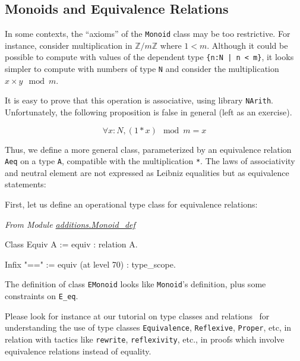 \subsection{Monoids and Equivalence Relations}

In some contexts, the ``axioms'' of the \texttt{Monoid} class  may be too restrictive.
For instance, consider multiplication in $\mathds{Z}/m\mathds{Z}$ where
 $1<m$.
Although it could be possible to compute with values of the dependent 
type \texttt{\{n:N | n < m\}}, 
it looks simpler to compute with numbers of type
\texttt{N} and consider the multiplication $x \times y \mod{m}$.



It is easy to prove that this operation is associative, using library \texttt{NArith}. Unfortunately, the following proposition is false in general (left as an exercise).

$$\forall x:N, (1 * x) \mod{m} = x$$


Thus, we define a more general class, parameterized by an equivalence
relation \texttt{Aeq}  on a type \texttt{A}, compatible with the multiplication \texttt{*}. The laws of associativity and neutral element
are not expressed as Leibniz equalities but as equivalence statements:

First, let us define an operational type class for equivalence relations:

\vspace{4pt}

\noindent
\emph{From Module \href{../theories/html/hydras.additions.Monoid_def.html}{additions.Monoid\_def}}

\begin{Coqsrc}
Class Equiv A := equiv : relation A.

Infix "==" := equiv (at level 70) : type_scope.
\end{Coqsrc}

The definition of class \texttt{EMonoid} looks like \texttt{Monoid}'s definition, 
plus some constraints on \texttt{E\_eq}.

Please look for instance at our tutorial on type classes and relations~\cite{PCMS} 
for understanding the use of  type classes \texttt{Equivalence}, \texttt{Reflexive}, \texttt{Proper}, etc, in relation with tactics like \texttt{rewrite}, \texttt{reflexivity}, etc., in proofs which involve  equivalence relations instead of equality.

\label{EMonoid-def}

